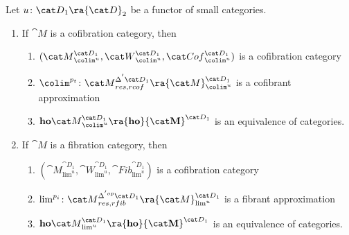 \begin{lem}
\label{lem:homotcatcolim}
Let $u \colon {\cat D}_1 \ra {\cat D}_2$ be a functor of small categories.
\begin{enumerate}
\item
If ${\cat M}$ is a cofibration category, then 
\begin{enumerate}
\item
$({\cat M}^{{\cat D}_1}_{{\colim}^u}, {\cat W}^{{\cat D}_1}_{{\colim}^u}, {\cat Cof}^{{\cat D}_1}_{{\colim}^u})$ is a cofibration category
\item
$\colim^{p_t} \colon {\cat M}^{\Delta^{'}{\cat D}_1}_{res, rcof} \ra {\cat M}^{{\cat D}_1}_{\colim^u}$ is a cofibrant approximation
\item
${\bf ho}{\cat M}^{{\cat D}_1}_{{\colim}^u} \ra {\bf ho}{\cat M}^{{\cat D}_1}$ is an equivalence of categories.
\end{enumerate}
\item
If ${\cat M}$ is a fibration category, then 
\begin{enumerate}
\item
$({\cat M}^{{\cat D}_1}_{{\lim}^u}, {\cat W}^{{\cat D}_1}_{{\lim}^u}, {\cat Fib}^{{\cat D}_1}_{{\lim}^u})$ is a cofibration category
\item
$\lim^{p_i} \colon {\cat M}^{\Delta^{'op}{\cat D}_1}_{res, rfib} \ra {\cat M}^{{\cat D}_1}_{\lim^u}$ is a fibrant approximation
\item
${\bf ho}{\cat M}^{{\cat D}_1}_{{\lim}^u} \ra {\bf ho}{\cat M}^{{\cat D}_1}$ is an equivalence of categories.
\end{enumerate}
\end{enumerate}
\end{lem}

